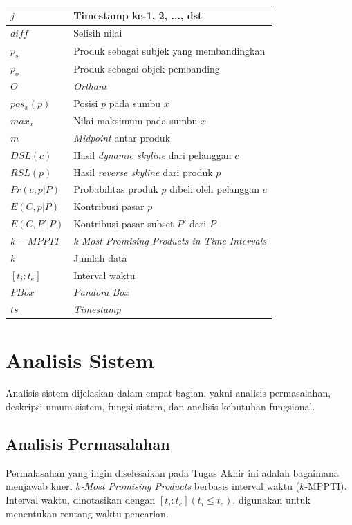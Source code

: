 \begin{longtable}{| p{3cm} | p{6cm} |}
	$j$ & Timestamp ke-1, 2, ..., dst\\ \hline
	$diff$ & Selisih nilai \\ \hline
	$p_s$ & Produk sebagai subjek yang membandingkan \\ \hline
	$p_o$ & Produk sebagai objek pembanding \\ \hline
	$O$ & \textit{Orthant}\\ \hline
	$pos_x(p)$ & Posisi $p$ pada sumbu $x$ \\ \hline
	$max_x$ & Nilai maksimum pada sumbu $x$ \\ \hline
	$m$ & \textit{Midpoint} antar produk\\ \hline
	$DSL(c)$ & Hasil \textit{dynamic skyline} dari pelanggan $c$\\ \hline
	$RSL(p)$ & Hasil \textit{reverse skyline} dari produk $p$\\ \hline
	$Pr(c, p|P)$ & Probabilitas produk $p$ dibeli oleh pelanggan $c$ \\ \hline
	$E(C, p|P)$ & Kontribusi pasar $p$\\ \hline
	$E(C, P'|P)$ & Kontribusi pasar subset $P'$ dari $P$ \\ \hline
	$k-MPPTI$ & \textit{k-Most Promising Products in Time Intervals} \\ \hline
	$k$ & Jumlah data \\ \hline
	$[t_i:t_e]$ & Interval waktu \\ \hline
	$PBox$ & \textit{Pandora Box} \\ \hline	
	$ts$ & \textit{Timestamp} \\ \hline	
	
\end{longtable}

\section{Analisis Sistem}
\tab Analisis sistem dijelaskan dalam empat bagian, yakni analisis permasalahan, deskripsi umum sistem, fungsi sistem, dan analisis kebutuhan fungsional.

\subsection{Analisis Permasalahan}
\tab Permalasahan yang ingin diselesaikan pada Tugas Akhir ini adalah bagaimana menjawab kueri \textit{$k$-Most Promising Products} berbasis interval waktu ($k$-MPPTI). Interval waktu, dinotasikan dengan $[t_i:t_e ](t_i \leq t_e)$, digunakan untuk menentukan rentang waktu pencarian.


